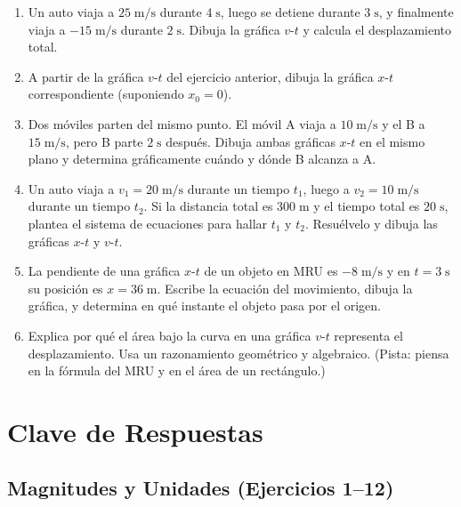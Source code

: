 \documentclass[12pt, a4paper]{article}
\begin{document}
\begin{enumerate}[leftmargin=*, resume]
  \item \medio{} Un auto viaja a $25\;\text{m/s}$ durante $4\;\text{s}$, luego se detiene durante $3\;\text{s}$, y finalmente viaja a $-15\;\text{m/s}$ durante $2\;\text{s}$. Dibuja la gráfica $v$-$t$ y calcula el desplazamiento total.

  \item \medio{} A partir de la gráfica $v$-$t$ del ejercicio anterior, dibuja la gráfica $x$-$t$ correspondiente (suponiendo $x_0 = 0$).

  \item \dificil{} Dos móviles parten del mismo punto. El móvil A viaja a $10\;\text{m/s}$ y el B a $15\;\text{m/s}$, pero B parte $2\;\text{s}$ después. Dibuja ambas gráficas $x$-$t$ en el mismo plano y determina gráficamente cuándo y dónde B alcanza a A.

  \item \dificil{} Un auto viaja a $v_1 = 20\;\text{m/s}$ durante un tiempo $t_1$, luego a $v_2 = 10\;\text{m/s}$ durante un tiempo $t_2$. Si la distancia total es $300\;\text{m}$ y el tiempo total es $20\;\text{s}$, plantea el sistema de ecuaciones para hallar $t_1$ y $t_2$. Resuélvelo y dibuja las gráficas $x$-$t$ y $v$-$t$.

  \item \dificil{} La pendiente de una gráfica $x$-$t$ de un objeto en MRU es $-8\;\text{m/s}$ y en $t = 3\;\text{s}$ su posición es $x = 36\;\text{m}$. Escribe la ecuación del movimiento, dibuja la gráfica, y determina en qué instante el objeto pasa por el origen.

  \item \dificil{} Explica por qué el área bajo la curva en una gráfica $v$-$t$ representa el desplazamiento. Usa un razonamiento geométrico y algebraico. (Pista: piensa en la fórmula del MRU y en el área de un rectángulo.)
\end{enumerate}

\newpage

\section{Clave de Respuestas}

\subsection*{Magnitudes y Unidades (Ejercicios 1--12)}
\end{document}
